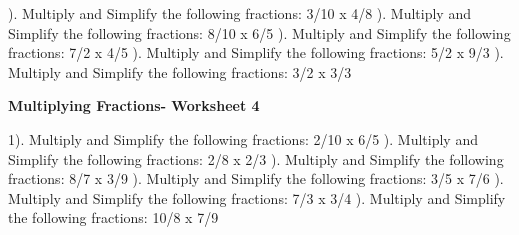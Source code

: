 \documentclass{article}%
\begin{document}
\newline%
). Multiply and Simplify the following fractions: 3/10 x 4/8%
\newline%
\newline%
). Multiply and Simplify the following fractions: 8/10 x 6/5%
\newline%
\newline%
). Multiply and Simplify the following fractions: 7/2 x 4/5%
\newline%
\newline%
). Multiply and Simplify the following fractions: 5/2 x 9/3%
\newline%
\newline%
). Multiply and Simplify the following fractions: 3/2 x 3/3%
\newline%
\newline%
\newline%
\pagebreak%
\large%
\begin{center}%
\textbf{Multiplying Fractions- Worksheet 4}%
\newline%
\end{center} \normalsize%
1). Multiply and Simplify the following fractions: 2/10 x 6/5%
\newline%
\newline%
). Multiply and Simplify the following fractions: 2/8 x 2/3%
\newline%
\newline%
). Multiply and Simplify the following fractions: 8/7 x 3/9%
\newline%
\newline%
). Multiply and Simplify the following fractions: 3/5 x 7/6%
\newline%
\newline%
). Multiply and Simplify the following fractions: 7/3 x 3/4%
\newline%
\newline%
). Multiply and Simplify the following fractions: 10/8 x 7/9%
\newline%
\newline%
\end{document}
